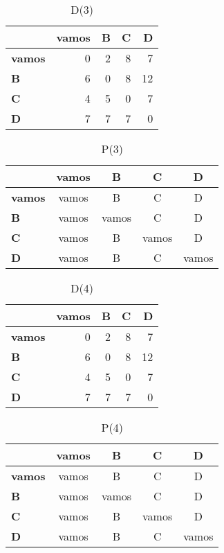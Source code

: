 \documentclass{article}
\begin{document}
\begin{table}[H]\centering
\caption{D(3)}
\begin{tabular}{l r r r r}
\toprule
 & \textbf{vamos} & \textbf{B} & \textbf{C} & \textbf{D}\\\midrule
\textbf{vamos} & 0 & 2 & 8 & 7 \\
\textbf{B} & 6 & 0 & 8 & 12 \\
\textbf{C} & 4 & 5 & 0 & 7 \\
\textbf{D} & 7 & 7 & 7 & 0 \\
\bottomrule
\end{tabular}
\end{table}

\begin{table}[H]\centering
\caption{P(3)}
\begin{tabular}{l c c c c}
\toprule
 & \textbf{vamos} & \textbf{B} & \textbf{C} & \textbf{D}\\\midrule
\textbf{vamos} & vamos & B & C & D \\
\textbf{B} & vamos & vamos & C & D \\
\textbf{C} & vamos & B & vamos & D \\
\textbf{D} & vamos & B & C & vamos \\
\bottomrule
\end{tabular}
\end{table}

\begin{table}[H]\centering
\caption{D(4)}
\begin{tabular}{l r r r r}
\toprule
 & \textbf{vamos} & \textbf{B} & \textbf{C} & \textbf{D}\\\midrule
\textbf{vamos} & 0 & 2 & 8 & 7 \\
\textbf{B} & 6 & 0 & 8 & 12 \\
\textbf{C} & 4 & 5 & 0 & 7 \\
\textbf{D} & 7 & 7 & 7 & 0 \\
\bottomrule
\end{tabular}
\end{table}

\begin{table}[H]\centering
\caption{P(4)}
\begin{tabular}{l c c c c}
\toprule
 & \textbf{vamos} & \textbf{B} & \textbf{C} & \textbf{D}\\\midrule
\textbf{vamos} & vamos & B & C & D \\
\textbf{B} & vamos & vamos & C & D \\
\textbf{C} & vamos & B & vamos & D \\
\textbf{D} & vamos & B & C & vamos \\
\bottomrule
\end{tabular}
\end{table}
\end{document}
